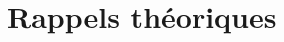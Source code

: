 \documentclass	[11pt, a4paper, openany]{book}
\begin{document}
\appendix
\chapter{Rappels théoriques}








































	
\end{document}
